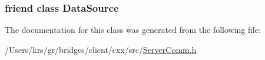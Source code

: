 \subsubsection[{Data\+Source}]{\setlength{\rightskip}{0pt plus 5cm}friend class {\bf Data\+Source}\hspace{0.3cm}{\ttfamily [friend]}}\label{classbridges_1_1_server_comm_a7998ddaa8bd7c3b9a7cd2a8cbf3573c4}


The documentation for this class was generated from the following file\+:\begin{DoxyCompactItemize}
\item 
/\+Users/krs/gr/bridges/client/cxx/src/\hyperlink{_server_comm_8h}{Server\+Comm.\+h}\end{DoxyCompactItemize}
